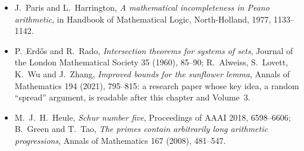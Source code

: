 \begin{itemize}
{Ramsey numbers}, Electronic Journal of Combinatorics, Dynamic Survey DS1 (regularly revised); V.~Angeltveit and B.~D.~McKay, \emph{$R(5,5)\le46$}, preprint, 2024.
\item J.~Paris and L.~Harrington, \emph{A mathematical incompleteness in Peano arithmetic}, in Handbook of Mathematical Logic, North-Holland, 1977, 1133--1142.
\item P.~Erd\H os and R.~Rado, \emph{Intersection theorems for systems of sets}, Journal of the London Mathematical Society 35 (1960), 85--90; R.~Alweiss, S.~Lovett, K.~Wu and
J.~Zhang, \emph{Improved bounds for the sunflower lemma}, Annals of Mathematics 194 (2021), 795--815: a research paper whose key idea, a random ``spread'' argument, is
readable after this chapter and Volume~3.
\item M.~J.~H.~Heule, \emph{Schur number five}, Proceedings of AAAI 2018, 6598--6606; B.~Green and T.~Tao, \emph{The primes contain arbitrarily long arithmetic progressions},
Annals of Mathematics 167 (2008), 481--547.
\end{itemize}
